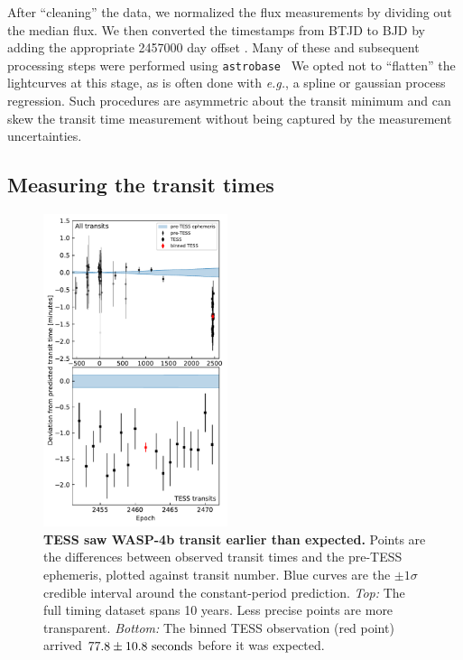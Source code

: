 \documentclass[12pt,twocolumn,tighten]{aastex62}
\begin{document}
After ``cleaning'' the data, we normalized the flux measurements by
dividing out the median flux.  We then converted the timestamps from
BTJD to BJD by adding the appropriate 2457000 day offset
\citep{tess_data_product_description_2018}.  Many of these and
subsequent processing steps were performed using
\texttt{astrobase}~\citep{bhatti_astrobase_2018} We opted not to
``flatten'' the lightcurves at this stage, as is often done with {\it
e.g.}, a spline or gaussian process regression.  Such procedures are
asymmetric about the transit minimum and can skew the transit time
measurement without being captured by the measurement uncertainties.



\subsection{Measuring the transit times}
\label{sec:measurement}

\begin{figure}[t]
    \begin{center}
        \leavevmode
        \includegraphics[width=0.48\textwidth]{f2.pdf}
    \end{center}
    \vspace{-0.6cm}
    \caption{
        {\bf TESS saw WASP-4b transit earlier than expected.}
        Points are the
        differences between observed transit times and the
        pre-TESS ephemeris, plotted against
        transit number.
        Blue curves are the
        $\pm 1\sigma$ credible interval around the constant-period
        prediction.
        {\it Top:} The full timing dataset spans 10 years.
                Less precise points are more transparent.
        {\it Bottom:}
        The binned TESS observation (red point) arrived
        $77.8 \pm 10.8\ {\rm seconds}$ before it was expected.
        \label{fig:arrived_early}
    }
\end{figure}
\end{document}
